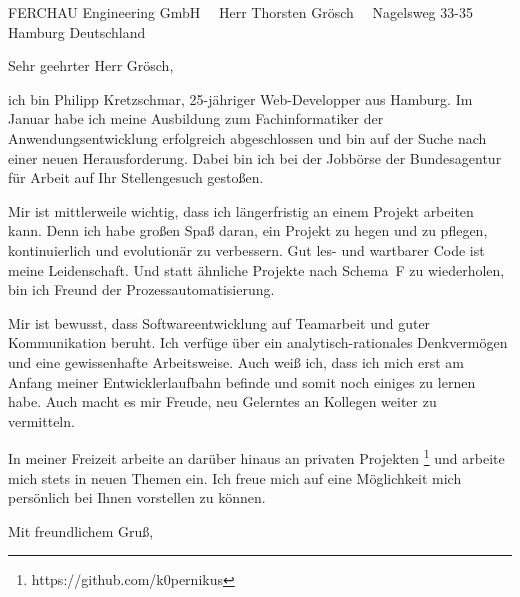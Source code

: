 \documentclass[paper=a4,pagesize]{scrlttr2}
\renewcommand{\\}{\ {\large\textperiodcentered}\ }
\begin{document}

\begin{letter}{ %
FERCHAU Engineering GmbH\\
Herr Thorsten Grösch\\
Nagelsweg 33-35 Hamburg
Deutschland
}


\opening{Sehr geehrter Herr Grösch,}

ich bin Philipp Kretzschmar, 25-jähriger Web-Developper aus Hamburg. Im Januar habe ich meine Ausbildung zum Fachinformatiker der Anwendungsentwicklung erfolgreich abgeschlossen und bin auf der Suche nach einer neuen Herausforderung. Dabei bin ich bei der Jobbörse der Bundesagentur für Arbeit auf Ihr Stellengesuch gestoßen.\\

Mir ist mittlerweile wichtig, dass ich längerfristig an einem Projekt arbeiten kann. Denn ich habe großen Spaß daran, ein Projekt zu hegen und zu pflegen, kontinuierlich und evolutionär zu verbessern. Gut les- und wartbarer Code ist meine Leidenschaft. Und statt ähnliche Projekte nach Schema F zu wiederholen, bin ich Freund der Pro­zess­automatisierung. \\

Mir ist bewusst, dass Softwareentwicklung auf Teamarbeit und guter Kommunikation beruht. Ich verfüge über ein analytisch-rationales Denkvermögen und eine gewissenhafte Arbeitsweise. Auch weiß ich, dass ich mich erst am Anfang meiner Entwicklerlaufbahn befinde und somit noch einiges zu lernen habe. Auch macht es mir Freude, neu Gelerntes an Kollegen weiter zu vermitteln.\\

In meiner Freizeit arbeite an darüber hinaus an privaten Projekten \footnote{https://github.com/k0pernikus} und arbeite mich stets in neuen Themen ein. Ich freue mich auf eine Möglichkeit mich persönlich bei Ihnen vorstellen zu können. \\ \\

Mit freundlichem Gruß,


\end{letter}
\end{document}
